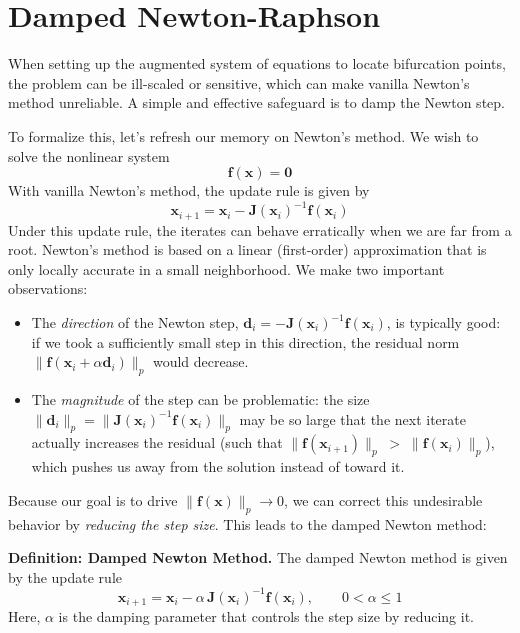 

\section{Damped Newton-Raphson}
When setting up the augmented system of equations to locate bifurcation points, the problem can be ill-scaled or sensitive, which can make vanilla Newton's method unreliable. A simple and effective safeguard is to damp the Newton step.

To formalize this, let's refresh our memory on Newton's method. We wish to solve the nonlinear system 
\[
\mathbf{f}(\mathbf{x})=\mathbf{0}
\]
With vanilla Newton's method, the update rule is given by
\[
\mathbf{x}_{i+1}=\mathbf{x}_i-\mathbf{J}(\mathbf{x}_i)^{-1}\mathbf{f}(\mathbf{x}_i)
\]
Under this update rule, the iterates can behave erratically when we are far from a root. Newton's method is based on a linear (first-order) approximation that is only locally accurate in a small neighborhood. We make two important observations:
\begin{itemize}
  \item The \emph{direction} of the Newton step, 
  \(\mathbf{d}_i=-\mathbf{J}(\mathbf{x}_i)^{-1}\mathbf{f}(\mathbf{x}_i)\), is typically good: if we took a sufficiently small step in this direction, the residual norm 
  \(\lVert \mathbf{f}(\mathbf{x}_i+\alpha \mathbf{d}_i)\rVert_p\) 
  would decrease.
  \item The \emph{magnitude} of the step can be problematic: the size 
  \(\lVert \mathbf{d}_i\rVert_p=\lVert \mathbf{J}(\mathbf{x}_i)^{-1}\mathbf{f}(\mathbf{x}_i)\rVert_p\) 
  may be so large that the next iterate actually increases the residual (such that \( \lVert \mathbf{f}(\mathbf{x}_{i+1})\rVert_p \;>\; \lVert \mathbf{f}(\mathbf{x}_i)\rVert_p \)), which pushes us away from the solution instead of toward it.
\end{itemize}
Because our goal is to drive \(\lVert \mathbf{f}(\mathbf{x})\rVert_p \to 0\), we can correct this undesirable behavior by \emph{reducing the step size}. This leads to the damped Newton method:
\begin{definitionBox}
    \textbf{Definition: Damped Newton Method.}
    The damped Newton method is given by the update rule
    \[
    \mathbf{x}_{i+1}=\mathbf{x}_i-\alpha\,\mathbf{J}(\mathbf{x}_i)^{-1}\mathbf{f}(\mathbf{x}_i),\qquad 0<\alpha\le 1
    \]
    Here, $\alpha$ is the damping parameter that controls the step size by reducing it.
\end{definitionBox}


